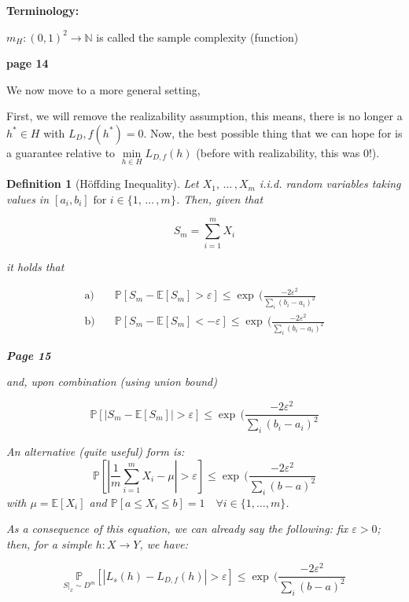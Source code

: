 \documentclass{scrarticle}
\newtheorem{definition}{Definition}[section]
\begin{document}
\textbf{Terminology:}

$m_H: (0,1)^2 \to \mathbb{N}$ is called the sample complexity (function)

\textbf{page 14}

We now move to a more general setting, 

First, we will remove the realizability assumption, this means, there is no longer a $h^*\in H$ with $L_D,f(h^*)=0$. Now, the best possible thing that we can hope for is a guarantee relative to $\underset{h \in H}{\min} L_{D,f}(h)$ (before with realizability, this was 0!).

\begin{definition}[Höffding Inequality]
Let $X_1,\,\ldots \,,X_m $ i.i.d. random variables taking values in $[a_i, b_i] \text{ for } i \in \{1, \, \ldots \,, m \}$. Then, given that

\begin{equation*}
    S_m=\sum^m_{i=1} X_i
\end{equation*}

it holds that 

\begin{align*}
    \text{a)}& \quad \mathbb{P}[S_m -\mathbb{E}[S_m]>\varepsilon] \leq \exp \,\big (\frac{-2\varepsilon^2}{\sum_i{(b_i-a_i)^2}}\\
    \text{b)}& \quad \mathbb{P}[S_m -\mathbb{E}[S_m]<-\varepsilon] \leq \exp \,\big (\frac{-2\varepsilon^2}{\sum_i{(b_i-a_i)^2}}
\end{align*}

\textbf{Page 15}

and, upon combination (using union bound) 

\begin{equation*}
    \mathbb{P}[|S_m -\mathbb{E}[S_m]|>\varepsilon] \leq \exp \,\big (\frac{-2\varepsilon^2}{\sum_i{(b_i-a_i)^2}}
\end{equation*}

An alternative (quite useful) form is: 
\begin{equation*}
    \mathbb{P}[|\frac{1}{m} \sum_{i=1}^m X_i -\mu|>\varepsilon] \leq \exp \,\big (\frac{-2\varepsilon^2}{\sum_i{(b-a)^2}}
\end{equation*}
with $\mu = \mathbb{E}[X_i]$ and $\mathbb{P}[a\leq X_i \leq b]=1 \quad \forall i \in \{1, \ldots, m\}$.

As a consequence of this equation, we can already say the following: fix $\varepsilon > 0$; then, for a simple $h:X \to Y$, we have:

\begin{equation*}
    \underset{S|_x \sim D^m}{\mathbb{P}}[|L_s(h)-L_{D,f}(h)|>\varepsilon] \leq \exp \,\big (\frac{-2\varepsilon^2}{\sum_i{(b-a)^2}}    
\end{equation*}


\end{definition}
\end{document}
